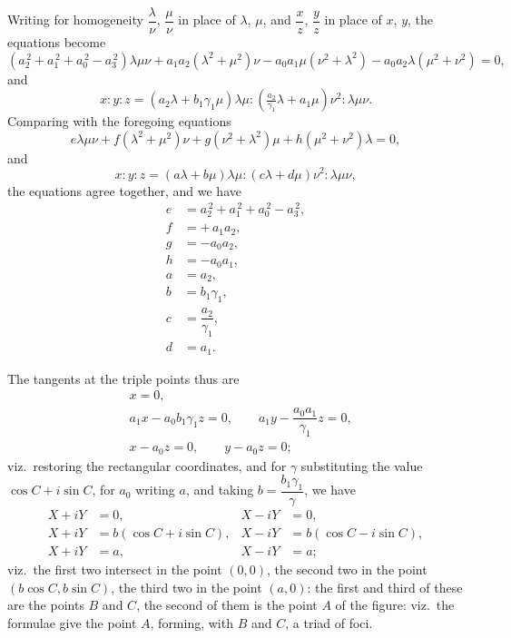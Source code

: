 \documentclass[11pt]{article}
\begin{document}
Writing for homogeneity $\dfrac{\lambda}{\nu}$, $\dfrac{\mu}{\nu}$ in place of $\lambda$, $\mu$, and $\dfrac{x}{z}$, $\dfrac{y}{z}$ in place of $x$, $y$, the equations become
\[
(a_2^{\,2} + a_1^{\,2} + a_0^{\,2} - a_3^{\,2})\lambda\mu\nu + a_1 a_2(\lambda^2 + \mu^2)\nu - a_0 a_1 \mu(\nu^2 + \lambda^2) - a_0 a_2 \lambda(\mu^2 + \nu^2) = 0,
\]
and
\[
x : y : z = (a_2\lambda + b_1\gamma_1\mu)\lambda\mu : \!\left(\tfrac{a_2}{\gamma_1}\lambda + a_1\mu\right)\!\nu^2 : \lambda\mu\nu.
\]
Comparing with the foregoing equations
\[
e\lambda\mu\nu + f(\lambda^2 + \mu^2)\nu + g(\nu^2 + \lambda^2)\mu + h(\mu^2 + \nu^2)\lambda = 0,
\]
and
\[
x : y : z = (a\lambda + b\mu)\lambda\mu : (c\lambda + d\mu)\nu^2 : \lambda\mu\nu,
\]
the equations agree together, and we have
\begin{align*}
e &= a_2^{\,2} + a_1^{\,2} + a_0^{\,2} - a_3^{\,2},\\
f &= +\,a_1 a_2,\\
g &= -a_0 a_2,\\
h &= -a_0 a_1,\\
a &= a_2,\\
b &= b_1\gamma_1,\\
c &= \dfrac{a_2}{\gamma_1},\\
d &= a_1.
\end{align*}

The tangents at the triple points thus are
\begin{align*}
&x = 0,\\
&a_1 x - a_0 b_1\gamma_1 z = 0,\qquad a_1 y - \dfrac{a_0 a_1}{\gamma_1} z = 0,\\
&x - a_0 z = 0,\qquad y - a_0 z = 0;
\end{align*}
viz.\ restoring the rectangular coordinates, and for $\gamma$ substituting the value $\cos C + i\sin C$, for $a_0$ writing $a$, and taking $b = \dfrac{b_1\gamma_1}{\gamma}$, we have
\begin{align*}
X + iY &= 0, & X - iY &= 0,\\
X + iY &= b(\cos C + i\sin C), & X - iY &= b(\cos C - i\sin C),\\
X + iY &= a, & X - iY &= a;
\end{align*}
viz.\ the first two intersect in the point $(0, 0)$, the second two in the point $(b\cos C, b\sin C)$, the third two in the point $(a, 0)$: the first and third of these are the points $B$ and $C$, the second of them is the point $A$ of the figure: viz.\ the formulae give the point $A$, forming, with $B$ and $C$, a triad of foci.

\end{document}
